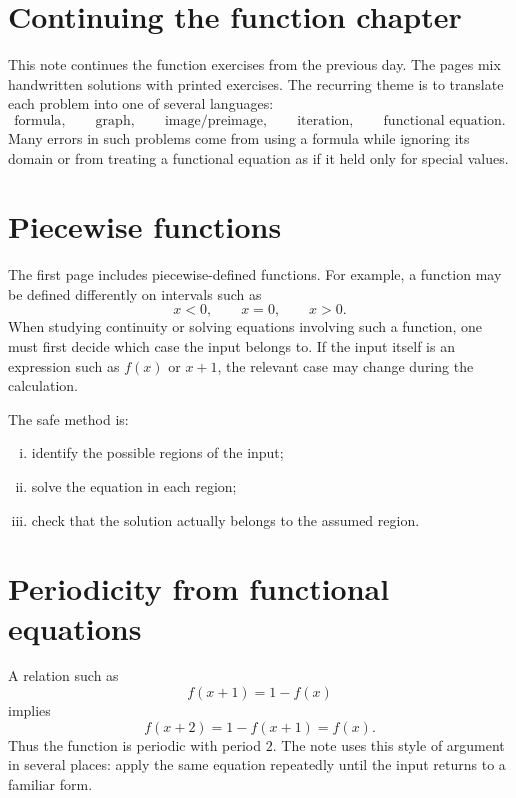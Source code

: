 \enlargethispage{4\baselineskip}

\section{Continuing the function chapter}

This note continues the function exercises from the previous day.  The pages mix handwritten solutions with printed exercises.  The recurring theme is to translate each problem into one of several languages:
\[
  \text{formula},\qquad \text{graph},\qquad \text{image/preimage},\qquad \text{iteration},\qquad \text{functional equation}.
\]
Many errors in such problems come from using a formula while ignoring its domain or from treating a functional equation as if it held only for special values.

\section{Piecewise functions}

The first page includes piecewise-defined functions.  For example, a function may be defined differently on intervals such as
\[
  x<0,\qquad x=0,\qquad x>0.
\]
When studying continuity or solving equations involving such a function, one must first decide which case the input belongs to.  If the input itself is an expression such as $f(x)$ or $x+1$, the relevant case may change during the calculation.

The safe method is:
\begin{enumerate}[(i)]
  \item identify the possible regions of the input;
  \item solve the equation in each region;
  \item check that the solution actually belongs to the assumed region.

\end{enumerate}

\section{Periodicity from functional equations}

A relation such as
\[
  f(x+1)=1-f(x)
\]
implies
\[
  f(x+2)=1-f(x+1)=f(x).
\]
Thus the function is periodic with period $2$.  The note uses this style of argument in several places: apply the same equation repeatedly until the input returns to a familiar form.

